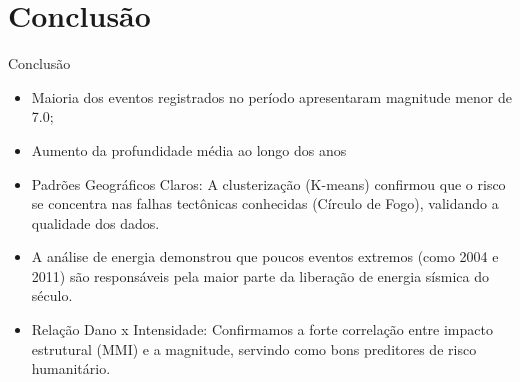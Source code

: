 \documentclass[aspectratio= 169, xcolor=dvipsnames]{beamer}
\begin{document}
\section{Conclusão}
\begin{frame}{Conclusão}
    \begin{itemize}
        \item Maioria dos eventos registrados no período apresentaram magnitude menor de 7.0; \vspace{0.5\baselineskip}
        \item Aumento da profundidade média ao longo dos anos \vspace{0.5\baselineskip}
        \item Padrões Geográficos Claros: A clusterização (K-means) confirmou que o risco se concentra nas falhas tectônicas conhecidas (Círculo de Fogo), validando a qualidade dos dados. \vspace{0.5\baselineskip}
        \item A análise de energia demonstrou que poucos eventos extremos (como 2004 e 2011) são responsáveis pela maior parte da liberação de energia sísmica do século. \vspace{0.5\baselineskip}
        \item Relação Dano x Intensidade: Confirmamos a forte correlação entre impacto estrutural (MMI) e a magnitude, servindo como bons preditores de risco humanitário.
    \end{itemize}
\end{frame}
\end{document}
